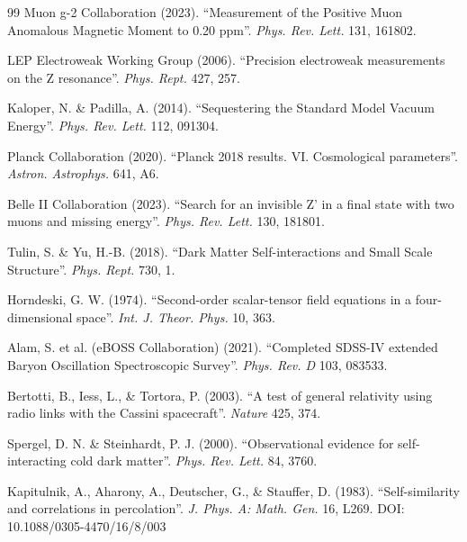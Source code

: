 \documentclass[a4paper,12pt]{article}
\begin{document}
\begin{thebibliography}{99}
 Muon g-2 Collaboration (2023). ``Measurement of the Positive Muon Anomalous Magnetic Moment to 0.20 ppm''. \textit{Phys. Rev. Lett.} 131, 161802.

 LEP Electroweak Working Group (2006). ``Precision electroweak measurements on the Z resonance''. \textit{Phys. Rept.} 427, 257.


 Kaloper, N. \& Padilla, A. (2014). ``Sequestering the Standard Model Vacuum Energy''. \textit{Phys. Rev. Lett.} 112, 091304.

 Planck Collaboration (2020). ``Planck 2018 results. VI. Cosmological parameters''. \textit{Astron. Astrophys.} 641, A6.

 Belle II Collaboration (2023). ``Search for an invisible Z' in a final state with two muons and missing energy''. \textit{Phys. Rev. Lett.} 130, 181801.

 Tulin, S. \& Yu, H.-B. (2018). ``Dark Matter Self-interactions and Small Scale Structure''. \textit{Phys. Rept.} 730, 1.

 Horndeski, G. W. (1974). ``Second-order scalar-tensor field equations in a four-dimensional space''. \textit{Int. J. Theor. Phys.} 10, 363.

 Alam, S. et al. (eBOSS Collaboration) (2021). ``Completed SDSS-IV extended Baryon Oscillation Spectroscopic Survey''. \textit{Phys. Rev. D} 103, 083533.


 Bertotti, B., Iess, L., \& Tortora, P. (2003). ``A test of general relativity using radio links with the Cassini spacecraft''. \textit{Nature} 425, 374.

 Spergel, D. N. \& Steinhardt, P. J. (2000). ``Observational evidence for self-interacting cold dark matter''. \textit{Phys. Rev. Lett.} 84, 3760.

 Kapitulnik, A., Aharony, A., Deutscher, G., \& Stauffer, D. (1983). ``Self-similarity and correlations in percolation''. \textit{J. Phys. A: Math. Gen.} 16, L269. DOI: 10.1088/0305-4470/16/8/003



\end{thebibliography}
\end{document}
